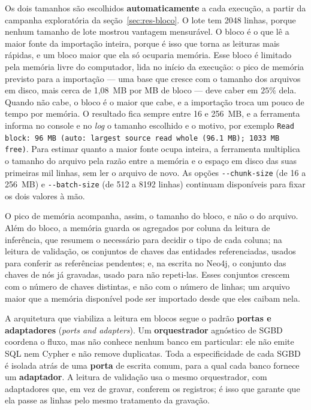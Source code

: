 Os dois tamanhos são escolhidos \textbf{automaticamente} a cada execução, a partir da
campanha exploratória da seção~\ref{sec:res-bloco}. O lote tem \num{2048} linhas, porque
nenhum tamanho de lote mostrou vantagem mensurável. O bloco é o que lê a maior fonte da
importação inteira, porque é isso que torna as leituras mais rápidas, e um bloco maior que
ela só ocuparia memória. Esse bloco é limitado pela memória livre do computador, lida no
início da execução: o pico de memória previsto para a importação --- uma base que cresce
com o tamanho dos arquivos em disco, mais cerca de 1,08~MB por MB de bloco --- deve caber em
$25\%$ dela. Quando não cabe, o bloco é o maior que cabe, e a importação troca um pouco de
tempo por memória. O resultado fica sempre entre 16 e 256~MB, e a ferramenta informa no
console e no \textit{log} o tamanho escolhido e o motivo, por exemplo
\texttt{Read block: 96 MB (auto: largest source read whole (96.1 MB); 1033 MB free)}. Para
estimar quanto a maior fonte ocupa inteira, a ferramenta multiplica o tamanho do arquivo pela
razão entre a memória e o espaço em disco das suas primeiras mil linhas, sem ler o arquivo de
novo. As opções \texttt{-{}-chunk-size} (de 16 a 256~MB) e \texttt{-{}-batch-size} (de 512 a
\num{8192} linhas) continuam disponíveis para fixar os dois valores à mão.

O pico de memória acompanha, assim, o tamanho do bloco, e não o do arquivo. Além do
bloco, a memória guarda os agregados por coluna da leitura de inferência, que resumem o
necessário para decidir o tipo de cada coluna; na leitura de validação, os conjuntos de
chaves das entidades referenciadas, usados para conferir as referências pendentes; e, na
escrita no Neo4j, o conjunto das chaves de nós já gravadas, usado para não repeti-las.
Esses conjuntos crescem com o número de chaves distintas, e não com o número de linhas;
um arquivo maior que a memória disponível pode ser importado desde que eles caibam nela.

A arquitetura que viabiliza a leitura em blocos segue o padrão \textbf{portas e
adaptadores} (\textit{ports and adapters}). Um \textbf{orquestrador} agnóstico de SGBD
coordena o fluxo, mas não conhece nenhum banco em particular: ele não emite SQL nem Cypher
e não remove duplicatas. Toda a especificidade de cada SGBD é isolada atrás de uma
\textbf{porta} de escrita comum, para a qual cada banco fornece um \textbf{adaptador}. A
leitura de validação usa o mesmo orquestrador, com adaptadores que, em vez de gravar,
conferem os registros; é isso que garante que ela passe as linhas pelo mesmo tratamento da
gravação.

